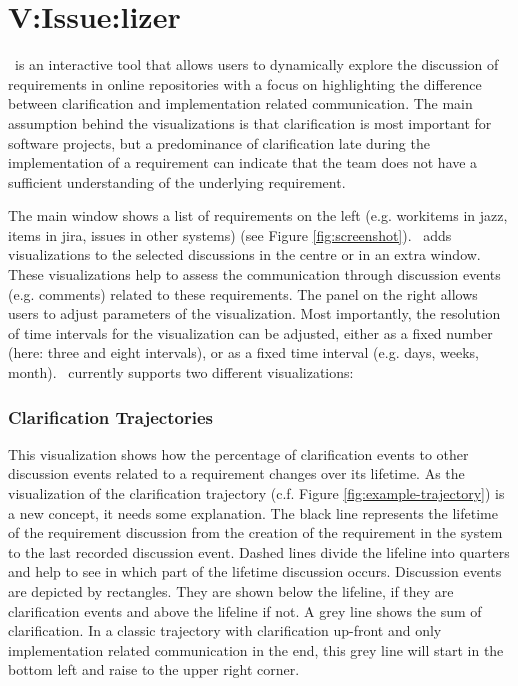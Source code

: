 \section{V:Issue:lizer}
\viss\ is an interactive tool that allows users to dynamically explore the discussion of requirements  in online repositories with a focus on highlighting the difference between clarification and implementation related communication.
The main assumption behind the visualizations is that clarification is most important for software projects, but a predominance of clarification late during the implementation of a requirement can indicate that the team does not have a sufficient understanding of the underlying requirement.

The main window shows a list of requirements on the  left (e.g. workitems in jazz, items in jira, issues in other systems) (see Figure \ref{fig:screenshot}).
\viss\ adds visualizations to the selected discussions in the centre or in an extra window. 
These visualizations help to assess the communication through discussion events (e.g. comments) related to these requirements.
The panel on the right allows users to adjust parameters of the visualization.
Most importantly, the resolution of time intervals for the visualization can be adjusted, either as a fixed number (here: three and eight intervals), or as a fixed time interval (e.g. days, weeks, month).
%
\viss\ currently supports two different visualizations: 

\subsubsection{Clarification Trajectories} 
This visualization shows how the percentage of clarification events to other discussion events related to a requirement changes over its lifetime.
As the visualization of the clarification trajectory (c.f. Figure \ref{fig:example-trajectory}) is a new concept, it needs some explanation.
The black line represents the lifetime of the requirement discussion from the creation of the requirement in the system to the last recorded discussion event.
Dashed lines divide the lifeline into quarters and help to see in which part of the lifetime discussion occurs.
Discussion events are depicted by rectangles.
They are shown below the lifeline, if they are clarification events and above the lifeline if not.
A grey line shows the sum of clarification.
In a classic trajectory with clarification up-front and only implementation related communication in the end, this grey line will start in the bottom left and raise to the upper right corner.

